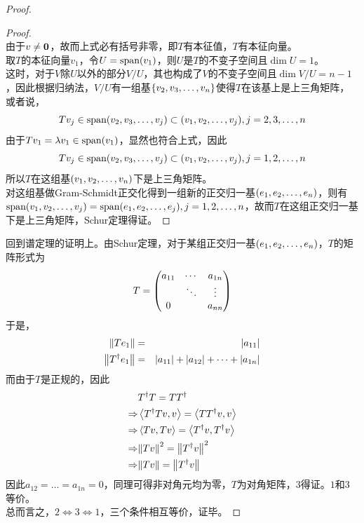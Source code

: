 \documentclass[12pt,a4paper,openany,twoside]{book}
\numberwithin{equation}{section}
\newcommand{\mean}[1]{\left\langle #1 \right\rangle}
\begin{document}
\begin{proof}
\begin{proof}
\begin{equation}
            \end{equation}
            由于$v\neq\vb{0}$，故而上式必有括号非零，即$T$有本征值，$T$有本征向量。\\
            取$T$的本征向量$v_1$，令$U=\text{span}\qty(v_1)$，则$U$是$T$的不变子空间且$\dim U=1$。\\
            这时，对于$V$除$U$以外的部分$V/U$，其也构成了$V$的不变子空间且$\dim V/U=n-1$，因此根据归纳法，$V/U$有一组基$\qty{v_2,v_3,\dots,v_n}$使得$T$在该基上是上三角矩阵，或者说，
            \begin{equation}
              Tv_j\in\text{span}\qty(v_2,v_3,\dots,v_j)\subset\qty(v_1,v_2,\dots,v_j), j=2,3,\dots,n
            \end{equation}
            由于$Tv_1=\lambda v_1\in\text{span}\qty(v_1)$，显然也符合上式，因此
            \begin{equation}
              Tv_j\in\text{span}\qty(v_2,v_3,\dots,v_j)\subset\qty(v_1,v_2,\dots,v_j), j=1,2,\dots,n
            \end{equation}
            所以$T$在这组基$\qty(v_1,v_2,\dots,v_n)$下是上三角矩阵。\\
            对这组基做Gram-Schmidt正交化得到一组新的正交归一基$\qty(e_1,e_2,\dots,e_n)$，则有$\text{span}\qty(v_1,v_2,\dots,v_j)=\text{span}\qty(e_1,e_2,\dots,e_j), j=1,2,\dots,n$，故而$T$在这组正交归一基下是上三角矩阵，Schur定理得证。
          \end{proof}
          回到谱定理的证明上。由Schur定理，对于某组正交归一基$\qty(e_1,e_2,\dots,e_n)$，$T$的矩阵形式为
          \begin{equation}
            T=\mqty(
              a_{11} & \cdots & a_{1n} \\
               & \ddots & \vdots \\
              0 & & a_{nn}
            )
          \end{equation}
          于是，
          \begin{eqnarray}
            \norm{Te_1}&=&\abs{a_{11}}\\
            \norm{T^\dagger e_1}&=&\abs{a_{11}}+\abs{a_{12}}+\dots+\abs{a_{1n}}
          \end{eqnarray}
          而由于$T$是正规的，因此
          \begin{equation}
            \begin{aligned}
              &T^\dagger T=TT^\dagger\\
              \Rightarrow&\mean{T^\dagger Tv,v}=\mean{TT^\dagger v,v}\\
              \Rightarrow&\mean{Tv,Tv}=\mean{T^\dagger v,T^\dagger v}\\
              \Rightarrow&\norm{Tv}^2=\norm{T^\dagger v}^2\\
              \Rightarrow&\norm{Tv}=\norm{T^\dagger v}
            \end{aligned}
          \end{equation}
          因此$a_{12}=\dots=a_{1n}=0$，同理可得非对角元均为零，$T$为对角矩阵，$3$得证。$1$和$3$等价。\\
          总而言之，$2\Leftrightarrow3\Leftrightarrow1$，三个条件相互等价，证毕。
        \end{proof}
\end{document}
